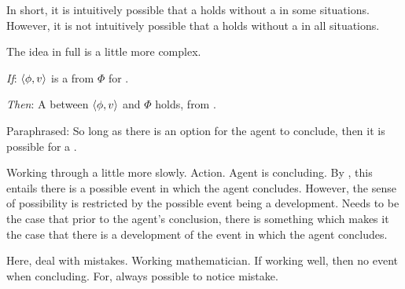 \begin{note}
  In short, it is intuitively possible that a \ros{} holds without a \wit{} in some situations.
  However, it is not intuitively possible that a \ros{} holds without a \wit{} in all situations.
\end{note}

\begin{note}
  The idea in full is a little more complex.

  \begin{idea}[\supportII{}]%
    \label{idea:support:possible}%
    \vspace{-\baselineskip}
    \begin{itenum}
    \item[\emph{If}:]
      \(\langle \phi, v \rangle\) is a  from \(\Phi\) for \vAgent{}.
    \item[\emph{Then}:]
      A \ros{} between \(\langle \phi, v \rangle\) and \(\Phi\) holds, from .
    \end{itenum}
    \vspace{-\baselineskip}
  \end{idea}

  \noindent%
  Paraphrased:
  So long as there is an option for the agent to conclude, then it is possible for a \ros{}.

  Working through a little more slowly.
  Action.
  Agent is concluding.
  By \assuPP{}, this entails there is a possible event in which the agent concludes.
  However, the sense of possibility is restricted by the possible event being a development.
  Needs to be the case that prior to the agent's conclusion, there is something which makes it the case that there is a development of the event in which the agent concludes.

  Here, deal with mistakes.
  Working mathematician.
  If working well, then no event when concluding.
  For, always possible to notice mistake.


\end{note}

